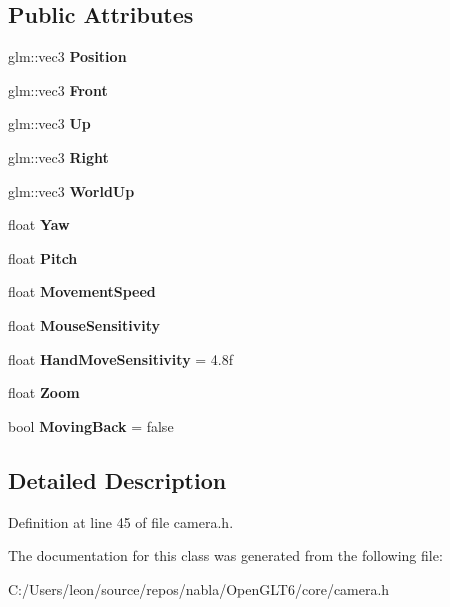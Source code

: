 \subsection*{Public Attributes}
\begin{DoxyCompactItemize}
\item 
\mbox{\label{class_camera_a9733b59f5340f6f1bca24d52a6679039}} 
glm\+::vec3 {\bfseries Position}
\item 
\mbox{\label{class_camera_ac95b3737115ffe9a6ff9128344d5b963}} 
glm\+::vec3 {\bfseries Front}
\item 
\mbox{\label{class_camera_ad74c4a490bc8865e67e27a2036d0a72d}} 
glm\+::vec3 {\bfseries Up}
\item 
\mbox{\label{class_camera_a6624f9f4228f6299a3d4ccb81e28da0a}} 
glm\+::vec3 {\bfseries Right}
\item 
\mbox{\label{class_camera_a340d30b833954b87fd016ce0e724c723}} 
glm\+::vec3 {\bfseries World\+Up}
\item 
\mbox{\label{class_camera_a1a1354a2bd2df7f18ef82924e671d241}} 
float {\bfseries Yaw}
\item 
\mbox{\label{class_camera_af9c8f223bb06bb74fc77c586545e7e67}} 
float {\bfseries Pitch}
\item 
\mbox{\label{class_camera_a63221392d762df6a74f45bc9d43a2f61}} 
float {\bfseries Movement\+Speed}
\item 
\mbox{\label{class_camera_a73e88844b31d5111eeb76327dfbb2d68}} 
float {\bfseries Mouse\+Sensitivity}
\item 
\mbox{\label{class_camera_a555e527ab443c107a65333383dfd88cc}} 
float {\bfseries Hand\+Move\+Sensitivity} = 4.\+8f
\item 
\mbox{\label{class_camera_a2becf27d08eb7e6da9c597c73ea95b5d}} 
float {\bfseries Zoom}
\item 
\mbox{\label{class_camera_ad3870c274e2e30851fc309c131903998}} 
bool {\bfseries Moving\+Back} = false
\end{DoxyCompactItemize}


\subsection{Detailed Description}


Definition at line 45 of file camera.\+h.



The documentation for this class was generated from the following file\+:\begin{DoxyCompactItemize}
\item 
C\+:/\+Users/leon/source/repos/nabla/\+Open\+G\+L\+T6/core/camera.\+h\end{DoxyCompactItemize}
